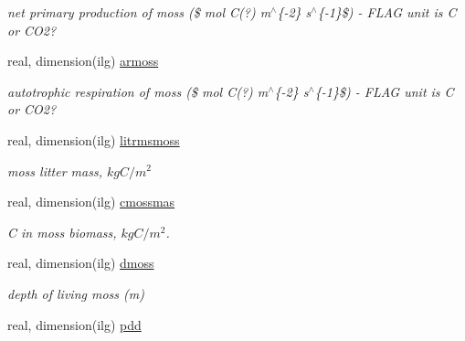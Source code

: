 \begin{DoxyCompactItemize}
\begin{DoxyCompactList}\small\item\em net primary production of moss (\$ mol C(?) m$^\wedge$\{-\/2\} s$^\wedge$\{-\/1\}\$) -\/ F\+L\+A\+G unit is C or C\+O2? \end{DoxyCompactList}\item 
\hypertarget{structctem__statevars_1_1veg__gat_a81bba029245578be36fc61e12e26f482}{}real, dimension(ilg) \hyperlink{structctem__statevars_1_1veg__gat_a81bba029245578be36fc61e12e26f482}{armoss}\label{structctem__statevars_1_1veg__gat_a81bba029245578be36fc61e12e26f482}

\begin{DoxyCompactList}\small\item\em autotrophic respiration of moss (\$ mol C(?) m$^\wedge$\{-\/2\} s$^\wedge$\{-\/1\}\$) -\/ F\+L\+A\+G unit is C or C\+O2? \end{DoxyCompactList}\item 
\hypertarget{structctem__statevars_1_1veg__gat_a45d85c222d3fd8de247cab02e9211ac7}{}real, dimension(ilg) \hyperlink{structctem__statevars_1_1veg__gat_a45d85c222d3fd8de247cab02e9211ac7}{litrmsmoss}\label{structctem__statevars_1_1veg__gat_a45d85c222d3fd8de247cab02e9211ac7}

\begin{DoxyCompactList}\small\item\em moss litter mass, $kg C/m^2$ \end{DoxyCompactList}\item 
\hypertarget{structctem__statevars_1_1veg__gat_a61630732de77398f2163d1f4cc54ef4a}{}real, dimension(ilg) \hyperlink{structctem__statevars_1_1veg__gat_a61630732de77398f2163d1f4cc54ef4a}{cmossmas}\label{structctem__statevars_1_1veg__gat_a61630732de77398f2163d1f4cc54ef4a}

\begin{DoxyCompactList}\small\item\em C in moss biomass, $kg C/m^2$. \end{DoxyCompactList}\item 
\hypertarget{structctem__statevars_1_1veg__gat_af2f0850a504fff247ffd5687ec41e05a}{}real, dimension(ilg) \hyperlink{structctem__statevars_1_1veg__gat_af2f0850a504fff247ffd5687ec41e05a}{dmoss}\label{structctem__statevars_1_1veg__gat_af2f0850a504fff247ffd5687ec41e05a}

\begin{DoxyCompactList}\small\item\em depth of living moss (m) \end{DoxyCompactList}\item 
\hypertarget{structctem__statevars_1_1veg__gat_ad5086ec1c276f83a2b90f4968fca197f}{}real, dimension(ilg) \hyperlink{structctem__statevars_1_1veg__gat_ad5086ec1c276f83a2b90f4968fca197f}{pdd}\label{structctem__statevars_1_1veg__gat_ad5086ec1c276f83a2b90f4968fca197f}


\end{DoxyCompactItemize}
